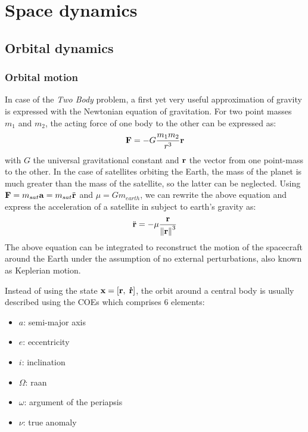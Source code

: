 \section{Space dynamics}\label{C2:space_dynamics}

\subsection{Orbital dynamics}

\subsubsection{Orbital motion}
In case of the \emph{Two Body} problem, a first yet very useful approximation of gravity is expressed with the Newtonian equation of gravitation. For two point masses $m_1$ and $m_2$, the acting force of one body to the other can be expressed as:
\begin{equation}
	\boldsymbol{\mathbf{F}}=-G \frac{m_1 m_2}{r^3} \boldsymbol{\mathbf{r}}
\end{equation}
with $G$ the universal gravitational constant and $\boldsymbol{\mathbf{r}}$ the vector from one point-mass to the other. In the case of satellites orbiting the Earth, the mass of the planet is much greater than the mass of the satellite, so the latter can be neglected. Using $\boldsymbol{\mathbf{F}} = m_{sat}\boldsymbol{\mathbf{a}} = m_{sat}\ddot{\boldsymbol{\mathbf{r}}}$ and $\mu = G m_{earth}$, we can rewrite the above equation and express the acceleration of a satellite in subject to earth's gravity as:
\begin{equation}
	\ddot{\boldsymbol{\mathbf{r}}} = -\mu \frac{\boldsymbol{\mathbf{r}}}{\left\| \boldsymbol{\mathbf{r}} \right\|^3}
\end{equation}
The above equation can be integrated to reconstruct the motion of the spacecraft around the Earth under the assumption of no external perturbations, also known as Keplerian motion.

Instead of using the state $\boldsymbol{\mathbf{x}} = \left[\boldsymbol{\mathbf{r}},\; \boldsymbol{\mathbf{\dot{r}}}\right]$, the orbit around a central body is usually described using the \gls{COEs} which comprises 6 elements:
\begin{itemize}
	\item $a$: semi-major axis
	\item $e$: eccentricity
	\item $i$: inclination
	\item $\Omega$: \gls{raan}
	\item $\omega$: argument of the periapsis
	\item $\nu$: true anomaly
\end{itemize}

